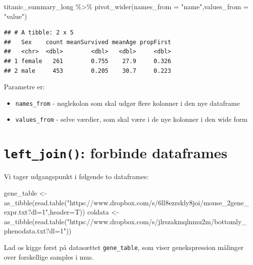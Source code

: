 \documentclass[
]{book}
\newenvironment{Shaded}{\begin{snugshade}}{\end{snugshade}}
\newcommand{\AttributeTok}[1]{\textcolor[rgb]{0.77,0.63,0.00}{#1}}
\newcommand{\FunctionTok}[1]{\textcolor[rgb]{0.00,0.00,0.00}{#1}}
\newcommand{\NormalTok}[1]{#1}
\newcommand{\OtherTok}[1]{\textcolor[rgb]{0.56,0.35,0.01}{#1}}
\newcommand{\SpecialCharTok}[1]{\textcolor[rgb]{0.00,0.00,0.00}{#1}}
\newcommand{\StringTok}[1]{\textcolor[rgb]{0.31,0.60,0.02}{#1}}
\providecommand{\tightlist}{%
  \setlength{\itemsep}{0pt}\setlength{\parskip}{0pt}}
\begin{document}
\begin{Shaded}
\begin{Highlighting}[]
\NormalTok{titanic\_summary\_long }\SpecialCharTok{\%\textgreater{}\%}
  \FunctionTok{pivot\_wider}\NormalTok{(}\AttributeTok{names\_from =} \StringTok{"name"}\NormalTok{,}\AttributeTok{values\_from =} \StringTok{"value"}\NormalTok{)}
\end{Highlighting}
\end{Shaded}

\begin{verbatim}
## # A tibble: 2 x 5
##   Sex    count meanSurvived meanAge propFirst
##   <chr>  <dbl>        <dbl>   <dbl>     <dbl>
## 1 female   261        0.755    27.9     0.326
## 2 male     453        0.205    30.7     0.223
\end{verbatim}

Parametre er:

\begin{itemize}
\tightlist
\item
  \texttt{names\_from} - nøglekolon som skal udgør flere kolonner i den nye dataframe
\item
  \texttt{values\_from} - selve værdier, som skal være i de nye kolonner i den wide form
\end{itemize}

\hypertarget{left_join-forbinde-dataframes}{%
\section{\texorpdfstring{\texttt{left\_join()}: forbinde dataframes}{left\_join(): forbinde dataframes}}\label{left_join-forbinde-dataframes}}

Vi tager udgangspunkt i følgende to dataframes:

\begin{Shaded}
\begin{Highlighting}[]
\NormalTok{gene\_table }\OtherTok{\textless{}{-}} \FunctionTok{as\_tibble}\NormalTok{(}\FunctionTok{read.table}\NormalTok{(}\StringTok{"https://www.dropbox.com/s/6ll8ezrskly8joi/mouse\_2gene\_expr.txt?dl=1"}\NormalTok{,}\AttributeTok{header=}\NormalTok{T))}
\NormalTok{coldata }\OtherTok{\textless{}{-}} \FunctionTok{as\_tibble}\NormalTok{(}\FunctionTok{read.table}\NormalTok{(}\StringTok{"https://www.dropbox.com/s/jlrszakmqlnmu2m/bottomly\_phenodata.txt?dl=1"}\NormalTok{))}
\end{Highlighting}
\end{Shaded}

Lad os kigge først på datasættet \texttt{gene\_table}, som viser genekspression målinger over forskellige samples i mus.
\end{document}
